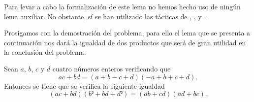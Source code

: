 Para levar a cabo la formalización de este lema no hemos hecho uso de
ningún lema auxiliar. No obstante, sí se han utilizado las tácticas de
,
,
 y 
.

Prosigamos con la demostración del problema, para ello el lema que se
presenta a continuación nos dará la igualdad de dos productos que será
de gran utilidad en la conclusión del problema.

\begin{lema}\label{q601lemaprod}
    Sean \(a\), \(b\), \(c\) y \(d\) cuatro números enteros verificando que 
    \begin{equation}\label{q601hipprod}\tag{h}
      ac+bd = (a+b-c+d)(-a+b+c+d).
    \end{equation}
    Entonces se tiene que se verifica la siguiente igualdad
    \begin{equation}\label{q601objprod}
      (ac+bd)(b²+bd+d²)=(ab+cd)(ad+bc).
    \end{equation}
\end{lema}

